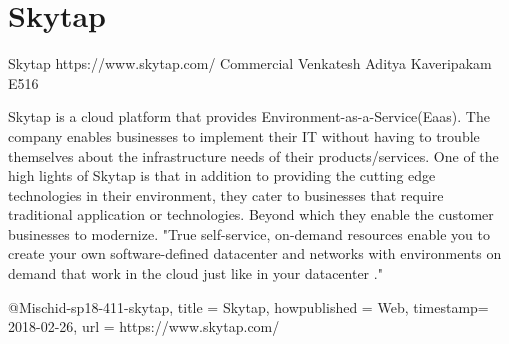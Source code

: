 \section{Skytap}

Skytap
https://www.skytap.com/
Commercial
Venkatesh Aditya Kaveripakam
E516

Skytap is a cloud platform that provides Environment-as-a-Service(Eaas). The
company enables businesses to implement their IT without having to
trouble themselves about the infrastructure needs of their products/services.
One of the high lights of Skytap is that in addition to providing the
cutting edge technologies in their environment, they cater to businesses that
require traditional application or technologies. Beyond which they enable the
customer businesses to modernize. "True self-service, on-demand resources
enable you to create your own software-defined datacenter and networks with
environments on demand that work in the cloud just like in your datacenter
."\cite{hid-sp18-411-skytap}

@Misc{hid-sp18-411-skytap,
title = {Skytap},
howpublished = {Web},
timestamp= {2018-02-26},
url = {https://www.skytap.com/}
}